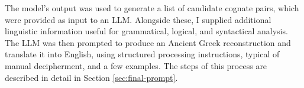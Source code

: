 The model's output was used to generate a list of candidate cognate pairs, which were provided as input to an LLM.  
Alongside these, I supplied additional linguistic information useful for grammatical, logical, and syntactical analysis.  
The LLM was then prompted to produce an Ancient Greek reconstruction and translate it into English, using structured processing instructions, typical of manual decipherment, and a few examples.  
The steps of this process are described in detail in Section \ref{sec:final-prompt}.

